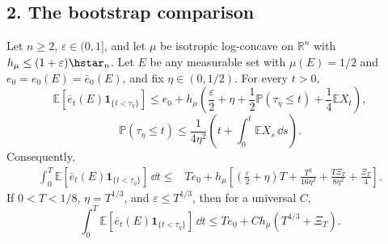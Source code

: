\documentclass[../main.tex]{subfiles}
\begin{document}
\subsection*{2. The bootstrap comparison}

\begin{theorem}
\label{thm:sol-bootstrap}
Let $n\geq2$, $\varepsilon\in(0,1]$, and let $\mu$ be isotropic log-concave on
$\mathbb R^n$ with
$h_\mu\leq(1+\varepsilon)\hstar_n$.  Let $E$ be any measurable set with
$\mu(E)=1/2$ and
$e_0=e_0(E)=\bar e_0(E)$, and fix $\eta\in(0,1/2)$.  For every $t>0$,
\begin{equation}
  \mathbb E[\bar e_t(E)\mathbf 1_{\{t<\tau_\eta\}}]
  \leq e_0+h_\mu\left(
    \frac\varepsilon2+\eta+\frac12\mathbb P(\tau_\eta\leq t)
    +\frac14\mathbb E X_t\right),
  \label{eq:sol-bootstrap-main}
\end{equation}
\begin{equation}
  \mathbb P(\tau_\eta\leq t)
  \leq\frac1{4\eta^2}\left(t+\int_0^t\mathbb E X_s\,\dd s\right).
  \label{eq:sol-bootstrap-exit}
\end{equation}
Consequently,
\begin{equation}
\begin{split}
  \int_0^T\mathbb E[\bar e_t(E)\mathbf 1_{\{t<\tau_\eta\}}]\,\dd t
  \leq{}&Te_0+h_\mu\left[
    \left(\frac\varepsilon2+\eta\right)T+
    \frac{T^2}{16\eta^2}+
    \frac{T\Xi_T}{8\eta^2}+\frac{\Xi_T}{4}\right].
\end{split}
\label{eq:sol-bootstrap-integrated}
\end{equation}
If $0<T<1/8$, $\eta=T^{1/3}$, and $\varepsilon\leq T^{1/3}$, then for a universal $C$,
\begin{equation}
  \int_0^T\mathbb E[\bar e_t(E)\mathbf 1_{\{t<\tau_\eta\}}]\,\dd t
  \leq Te_0+C h_\mu(T^{4/3}+\Xi_T).
  \label{eq:sol-bootstrap-clean}
\end{equation}
\end{theorem}
\end{document}

